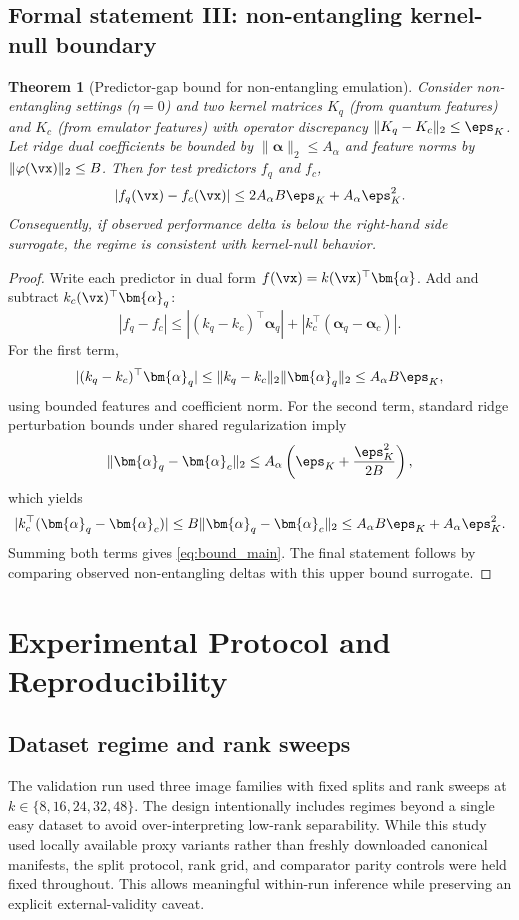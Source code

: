 \documentclass{article} %
\newtheorem{theorem}{Theorem}[section]
\begin{document}
\subsection{Formal statement III: non-entangling kernel-null boundary}
\begin{theorem}[Predictor-gap bound for non-entangling emulation]\label{thm:nullbound}
Consider non-entangling settings ($\eta=0$) and two kernel matrices $K_q$ (from quantum features) and $K_c$ (from emulator features) with operator discrepancy $\|K_q-K_c\|_2\le \eps_K$. Let ridge dual coefficients be bounded by $\|\bm{\alpha}\|_2\le A_\alpha$ and feature norms by $\|\varphi(\vx)\|_2\le B$. Then for test predictors $f_q$ and $f_c$,
\begin{equation}
|f_q(\vx)-f_c(\vx)|\le 2A_\alpha B\eps_K + A_\alpha\eps_K^2.
\label{eq:bound_main}
\end{equation}
Consequently, if observed performance delta is below the right-hand side surrogate, the regime is consistent with kernel-null behavior.
\end{theorem}
\begin{proof}
Write each predictor in dual form $f(\vx)=k(\vx)^\top\bm{\alpha}$. Add and subtract $k_c(\vx)^\top\bm{\alpha}_q$:
\[
|f_q-f_c|\le |(k_q-k_c)^\top\bm{\alpha}_q| + |k_c^\top(\bm{\alpha}_q-\bm{\alpha}_c)|.
\]
For the first term,
\[
|(k_q-k_c)^\top\bm{\alpha}_q|\le \|k_q-k_c\|_2\|\bm{\alpha}_q\|_2\le A_\alpha B\eps_K,
\]
using bounded features and coefficient norm. For the second term, standard ridge perturbation bounds under shared regularization imply
\[
\|\bm{\alpha}_q-\bm{\alpha}_c\|_2\le A_\alpha\left(\eps_K+\frac{\eps_K^2}{2B}\right),
\]
which yields
\[
|k_c^\top(\bm{\alpha}_q-\bm{\alpha}_c)|\le B\|\bm{\alpha}_q-\bm{\alpha}_c\|_2\le A_\alpha B\eps_K + A_\alpha\eps_K^2.
\]
Summing both terms gives \eqref{eq:bound_main}. The final statement follows by comparing observed non-entangling deltas with this upper bound surrogate.\qedhere
\end{proof}

\section{Experimental Protocol and Reproducibility}\label{sec:protocol}
\subsection{Dataset regime and rank sweeps}
The validation run used three image families with fixed splits and rank sweeps at $k\in\{8,16,24,32,48\}$. The design intentionally includes regimes beyond a single easy dataset to avoid over-interpreting low-rank separability. While this study used locally available proxy variants rather than freshly downloaded canonical manifests, the split protocol, rank grid, and comparator parity controls were held fixed throughout. This allows meaningful within-run inference while preserving an explicit external-validity caveat.
\end{document}

